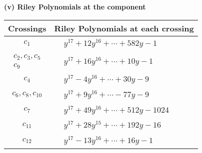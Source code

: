 \documentclass[1p]{elsarticle_modified}
\theoremstyle{definition}
\begin{document}
\flushleft \textbf{(v) Riley Polynomials at the component}\newline \\
\begin{tabular}{m{50pt}|m{274pt}}
Crossings & \hspace{64pt}Riley Polynomials at each crossing \\
\hline $$\begin{aligned}c_{1}\end{aligned}$$&$\begin{aligned}
&y^{17}+12 y^{16}+\cdots+582 y-1
\end{aligned}$\\
\hline $$\begin{aligned}c_{2},c_{3},c_{5}\\c_{9}\end{aligned}$$&$\begin{aligned}
&y^{17}+16 y^{16}+\cdots+10 y-1
\end{aligned}$\\
\hline $$\begin{aligned}c_{4}\end{aligned}$$&$\begin{aligned}
&y^{17}-4 y^{16}+\cdots+30 y-9
\end{aligned}$\\
\hline $$\begin{aligned}c_{6},c_{8},c_{10}\end{aligned}$$&$\begin{aligned}
&y^{17}+9 y^{16}+\cdots-77 y-9
\end{aligned}$\\
\hline $$\begin{aligned}c_{7}\end{aligned}$$&$\begin{aligned}
&y^{17}+49 y^{16}+\cdots+512 y-1024
\end{aligned}$\\
\hline $$\begin{aligned}c_{11}\end{aligned}$$&$\begin{aligned}
&y^{17}+28 y^{15}+\cdots+192 y-16
\end{aligned}$\\
\hline $$\begin{aligned}c_{12}\end{aligned}$$&$\begin{aligned}
&y^{17}-13 y^{16}+\cdots+16 y-1
\end{aligned}$\\
\hline
\end{tabular}\\~\\
\end{document}
